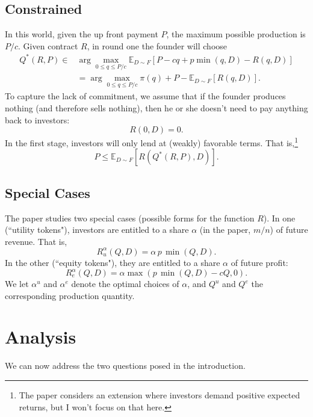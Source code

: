 \documentclass[11pt, oneside]{article}   	%
\newcommand{\E}{\mathbb{E}}
\begin{document}
\subsection{Constrained}
In this world, given the up front payment $P$, the maximum possible production is $P/c$. Given contract $R$, in round one the founder will choose 
\begin{align} Q^*(R,P) \in &  \arg \max_{0 \leq q \leq P/c} \E_{D\sim F}[P - c q + p\min(q,D) - R(q,D)] \nonumber \\ 
& =  \arg \max_{0 \leq q \leq P/c} \pi(q) + P - \E_{D \sim F}[R(q,D)].\label{eq:moralhazard} \end{align}
 To capture the lack of commitment, we assume that if the founder produces nothing (and therefore sells nothing), then he or she doesn't need to pay anything back to investors: 
\begin{equation} R(0,D) = 0. \label{eq:nocommitment}\end{equation}
In the first stage, investors will only lend at (weakly) favorable terms. That is,\footnote{The paper considers an extension where investors demand positive expected returns, but I won't focus on that here.}
\begin{equation}P \leq \E_{D\sim F}[R(Q^*(R,P),D)].\label{eq:investorIC} \end{equation}


\subsection{Special Cases}

The paper studies two special cases (possible forms for the function $R$). In one (``utility tokens"), investors are entitled to a share $\alpha$ (in the paper, $m/n$) of future revenue. That is, 
\[R_u^\alpha(Q,D) = \alpha \, p \, \min(Q,D).\]
In the other (``equity tokens"), they are entitled to a share $\alpha$ of future profit: 
\[R_e^\alpha(Q,D) = \alpha \max ( p \, \min(Q,D) - c Q,0).\]
We let $\alpha^u$ and $\alpha^e$ denote the optimal choices of $\alpha$, and $Q^u$ and $Q^e$ the corresponding production quantity.

\section{Analysis}

We can now address the two questions posed in the introduction. 
\end{document}

